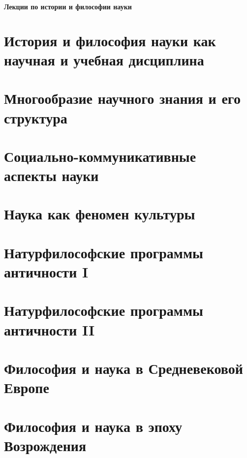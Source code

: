 \documentclass[a4paper, 12pt, notitlepage]{report}
\begin{document}
\begin{titlepage}
    \centering
    \vspace*{9cm}
    {\Huge \textbf{Лекции по истории и философии науки}}
    \vfill
\end{titlepage}

\tableofcontents

\chapter{История и философия науки как научная и учебная дисциплина}


\chapter{Многообразие научного знания и его структура}


\chapter{Социально-коммуникативные аспекты науки}


\chapter{Наука как феномен культуры}


\chapter{Натурфилософские программы античности I}



\chapter{Натурфилософские программы античности II}



\chapter{Философия и наука в Средневековой Европе}



\chapter{Философия и наука в эпоху Возрождения}


\end{document}
